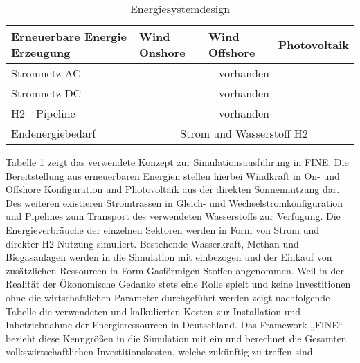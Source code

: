 \begin{table}[ht!]
    \begin{tabular}{|lcll|}
        \hline
        \multicolumn{1}{|l|}{Erneuerbare Energie Erzeugung} & \multicolumn{1}{l|}{Wind Onshore} & \multicolumn{1}{l|}{Wind Offshore} & Photovoltaik \\ \hline
        \multicolumn{1}{|l|}{Stromnetz AC}     & \multicolumn{3}{c|}{vorhanden}                \\ \hline
        \multicolumn{1}{|l|}{Stromnetz DC}     & \multicolumn{3}{c|}{vorhanden}                \\ \hline
        \multicolumn{1}{|l|}{H2 - Pipeline}    & \multicolumn{3}{c|}{vorhanden}                \\ \hline
        \multicolumn{1}{|l|}{Endenergiebedarf} & \multicolumn{3}{c|}{Strom und Wasserstoff H2} \\ \hline
    \end{tabular}
    \caption{Energiesystemdesign}
    \label{tab:systemdesign}
\end{table}


Tabelle \ref{tab:systemdesign} zeigt das verwendete Konzept zur Simulationsausführung in FINE. Die Bereitstellung aus erneuerbaren Energien stellen hierbei Windkraft in On- und Offshore Konfiguration und Photovoltaik aus der direkten Sonnennutzung dar. Des weiteren existieren
Stromtrassen in Gleich- und Wechselstromkonfiguration und Pipelines zum Transport des verwendeten Wasserstoffs zur Verfügung. Die Energieverbräuche der einzelnen Sektoren werden in Form von Strom und direkter H2 Nutzung simuliert. Bestehende Wasserkraft, Methan und Biogasanlagen werden in die Simulation mit einbezogen und der Einkauf von
zusätzlichen Ressourcen in Form Gasförmigen Stoffen angenommen. Weil in der Realität der Ökonomische Gedanke stets eine Rolle spielt und keine Investitionen ohne die wirtschaftlichen Parameter durchgeführt werden zeigt nachfolgende Tabelle  die verwendeten und kalkulierten Kosten zur Installation und Inbetriebnahme der Energieressourcen in Deutschland. Das Framework „FINE“ bezieht diese Kenngrößen in die Simulation mit ein und berechnet die Gesamten volkswirtschaftlichen Investitionskosten, welche zukünftig zu treffen sind. 


